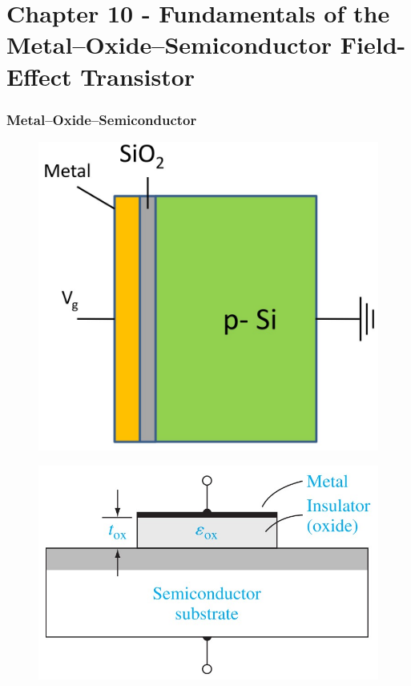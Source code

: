 \documentclass{beamer}
\begin{document}
\section{Chapter 10 - Fundamentals of the Metal–Oxide–Semiconductor Field-Effect Transistor}
    \begin{frame} \frametitle{Metal–Oxide–Semiconductor}
        \begin{minipage}{\linewidth}
            \begin{minipage}{0.45\linewidth}
                \begin{figure}[H]
                    \centering
                    \includegraphics[width=0.8\linewidth]{MOS-graph-horizontal.jpg}
                    \label{fig:MOS-graph-horizontal.jpg}
                \end{figure}
            \end{minipage}
            \begin{minipage}{0.45\linewidth}
                \begin{figure}[H]
                    \centering
                    \includegraphics[width=0.8\linewidth]{MOS-graph-vertical.jpg}

\end{figure}
\end{minipage}
\end{minipage}
\end{frame}
\end{document}
